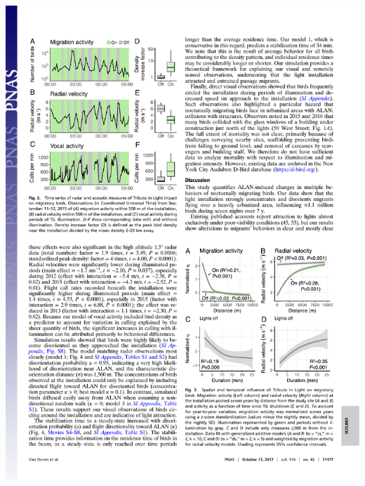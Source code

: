 \documentclass[a4paper, twoside]{templates/ociamthesis}
\begin{document}
\begin{center}\includegraphics[width=1\linewidth]{pdf_chapters/lights/lights_crop_Part3} \end{center}
\end{document}
